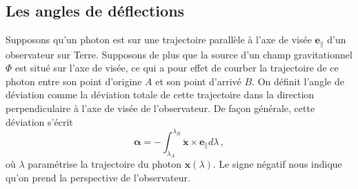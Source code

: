 





\subsection{Les angles de déflections}

Supposons qu'un photon est sur une trajectoire parallèle à l'axe de 
visée $\mathbf{e}_{\parallel}$ d'un observateur sur Terre. 
Supposons de plus que la source d'un champ gravitationnel $\Phi$ est situé sur l'axe de visée, 
ce qui a pour effet de courber la 
trajectoire de ce photon entre son point d'origine $A$ et son point d'arrivé $B$.
On définit l'angle de déviation comme la déviation totale de cette trajectoire 
dans la direction perpendiculaire à l'axe de visée de l'observateur. 
De façon générale, cette déviation s'écrit
\begin{equation}\label{eq:intro alpha}
        \boldsymbol{ \alpha} = - \int_{\lambda_A}^{\lambda_B} \ddot{\mathbf{x}} \times \mathbf{e}_{\parallel} d\lambda\, ,
\end{equation}
où $\lambda$ paramétrise la trajectoire du photon $\mathbf{x}(\lambda)$. 
Le signe négatif nous indique qu'on prend la perspective de l'observateur. 


